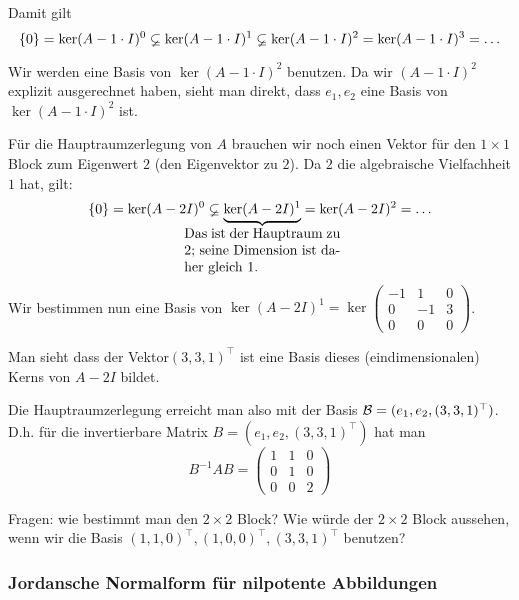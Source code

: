 \begin{bsp}
	Damit gilt
	\begin{equation*}
		\left\{ 0 \right\} = \ker(A-1\cdot I)^0 \varsubsetneq \ker(A-1\cdot I)^1\varsubsetneq \ker(A-1\cdot I)^2 = \ker(A-1\cdot I)^3 = \ldots
	\end{equation*}
	
	Wir werden eine Basis von $ \ker(A - 1\cdot I)^2 $ benutzen. Da wir $(A - 1\cdot I)^2$ explizit ausgerechnet haben, sieht man direkt, dass  $ e_1,e_2 $ eine Basis von $ \ker(A - 1\cdot I)^2 $ ist. 
	
	Für die Hauptraumzerlegung von $A$ brauchen wir noch einen Vektor für den $1 \times 1$ Block zum Eigenwert $2$ (den Eigenvektor zu $2$). Da $2$ die algebraische Vielfachheit $1$ hat, gilt: 
	\begin{equation*}
		\set{0} = \ker(A - 2I)^0 \varsubsetneq \underbrace{\ker(A - 2I)^1}_{\mathclap{\begin{minipage}{0.325\textwidth}
					Das ist der Hauptraum zu 2; seine Dimension ist daher gleich 1.
		\end{minipage}}} = \ker(A - 2I)^2 = \ldots
	\end{equation*}
	Wir bestimmen nun eine Basis von $ \ker(A-2I)^1 = \ker\begin{pmatrix}
		-1 & 1 & 0 \\
		0 & -1 & 3 \\
		0 & 0 & 0
	\end{pmatrix} $. 
	
	Man sieht dass der Vektor$ (3,3,1)^\top $ ist eine Basis dieses (eindimensionalen) Kerns von $A - 2 I$ bildet. 
	
	Die Hauptraumzerlegung erreicht man also mit der Basis $ \mathcal{B} = (e_1,e_2,(3,3,1)^\top) $. D.h. für die invertierbare Matrix $ B = (e_1,e_2,(3,3,1)^\top) $ hat man
	\begin{equation*}
		B^{-1}AB = \left(\begin{array}{cc|c}
			1 & 1 & 0 \\
			0 & 1 & 0 \\ \hline
			0 & 0 & 2
		\end{array}\right)
	\end{equation*}
	
	Fragen: wie bestimmt man den $2 \times 2$ Block? Wie würde der $2 \times 2$ Block aussehen, wenn wir die Basis $ (1,1,0)^\top,(1,0,0)^\top,(3,3,1)^\top $ benutzen? 
\end{bsp}


\subsubsection{Jordansche Normalform für nilpotente Abbildungen}
\label{sec:6_4_8}

